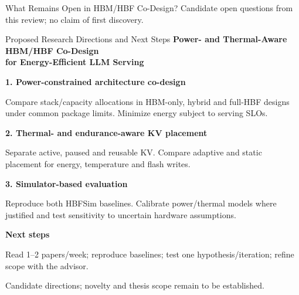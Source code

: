 \begin{frame}[c]{What Remains Open in HBM/HBF Co-Design?}
{\color{Muted}Candidate open questions from this review; no claim of first discovery.}
\end{frame}

\begingroup
\renewcommand{\reviewpoint}[2]{\par{\bfseries\color{Accent}#1}\par #2\par\smallskip}
\begin{frame}[t]{Proposed Research Directions and Next Steps}
\vspace{0cm}
{\bfseries\color{Accent}Power- and Thermal-Aware HBM/HBF Co-Design\\for Energy-Efficient LLM Serving}\par\medskip
\reviewpoint{1. Power-constrained architecture co-design}{Compare stack/capacity allocations in HBM-only, hybrid and full-HBF designs under common package limits. Minimize energy subject to serving SLOs.}
\reviewpoint{2. Thermal- and endurance-aware KV placement}{Separate active, paused and reusable KV. Compare adaptive and static placement for energy, temperature and flash writes.}
\reviewpoint{3. Simulator-based evaluation}{Reproduce both HBFSim baselines. Calibrate power/thermal models where justified and test sensitivity to uncertain hardware assumptions.}
{\bfseries\color{Accent}Next steps}\par\smallskip
Read 1--2 papers/week; reproduce baselines; test one hypothesis/iteration; refine scope with the advisor.
\par{\small\color{Muted}Candidate directions; novelty and thesis scope remain to be established.}
\end{frame}

\endgroup

